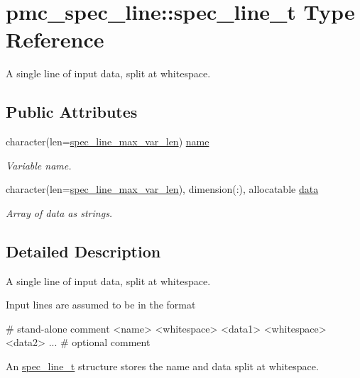\hypertarget{structpmc__spec__line_1_1spec__line__t}{}\section{pmc\+\_\+spec\+\_\+line\+:\+:spec\+\_\+line\+\_\+t Type Reference}
\label{structpmc__spec__line_1_1spec__line__t}


A single line of input data, split at whitespace.  


\subsection*{Public Attributes}
\begin{DoxyCompactItemize}
\item 
character(len=\mbox{\hyperlink{namespacepmc__spec__line_a54f3958fcd2d7924fc1b9659e5442876}{spec\+\_\+line\+\_\+max\+\_\+var\+\_\+len}}) \mbox{\hyperlink{structpmc__spec__line_1_1spec__line__t_a2c3228d54fb1fa9f8dba3bce96b0952b}{name}}
\begin{DoxyCompactList}\small\item\em Variable name. \end{DoxyCompactList}\item 
character(len=\mbox{\hyperlink{namespacepmc__spec__line_a54f3958fcd2d7924fc1b9659e5442876}{spec\+\_\+line\+\_\+max\+\_\+var\+\_\+len}}), dimension(\+:), allocatable \mbox{\hyperlink{structpmc__spec__line_1_1spec__line__t_a9093e9ada6cefc71ebc9ce157ef15ca2}{data}}
\begin{DoxyCompactList}\small\item\em Array of data as strings. \end{DoxyCompactList}\end{DoxyCompactItemize}


\subsection{Detailed Description}
A single line of input data, split at whitespace. 

Input lines are assumed to be in the format 
\begin{DoxyPre}
 \# stand-alone comment
 <name> <whitespace> <data1> <whitespace> <data2> ... \# optional comment
 \end{DoxyPre}
 An \mbox{\hyperlink{structpmc__spec__line_1_1spec__line__t}{spec\+\_\+line\+\_\+t}} structure stores the name and data split at whitespace. 

